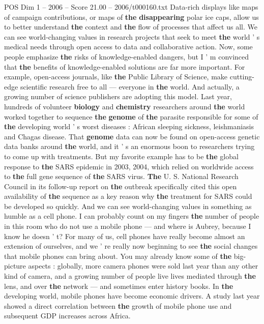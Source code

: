 \begin{textsample}{POS Dim 1 – 2006 – Score 21.00 – 2006/t000160.txt}
Data-rich displays like maps of campaign contributions, or maps of \textbf{the} \textbf{disappearing} polar ice caps, allow us to better understand \textbf{the} context and \textbf{the} flow of processes that affect us all.
We can see world-changing values in research projects that seek to meet \textbf{the} world ' s medical needs through open access to data and collaborative action.
Now, some people emphasize \textbf{the} risks of knowledge-enabled dangers, but I ' m convinced that \textbf{the} benefits of knowledge-enabled solutions are far more important.
For example, open-access journals, like \textbf{the} Public Library of Science, make cutting-edge scientific research free to all — everyone in \textbf{the} world.
And actually, a growing number of science publishers are adopting this model.
Last year, hundreds of volunteer \textbf{biology} and \textbf{chemistry} researchers around \textbf{the} world worked together to sequence \textbf{the} \textbf{genome} of \textbf{the} parasite responsible for some of \textbf{the} developing world ' s worst diseases : African sleeping sickness, leishmaniasis and Chagas disease.
That \textbf{genome} data can now be found on open-access genetic data banks around \textbf{the} world, and it ' s an enormous boon to researchers trying to come up with treatments.
But my favorite example has to be \textbf{the} global response to \textbf{the} SARS epidemic in 2003, 2004, which relied on worldwide access to \textbf{the} full gene sequence of \textbf{the} SARS virus. \textbf{The} U.
S.
National Research Council in its follow-up report on \textbf{the} outbreak specifically cited this open availability of \textbf{the} sequence as a key reason why \textbf{the} treatment for SARS could be developed so quickly.
And we can see world-changing values in something as humble as a cell phone.
I can probably count on my fingers \textbf{the} number of people in this room who do not use a mobile phone — and where is Aubrey, because I know he doesn ' t?
For many of us, cell phones have really become almost an extension of ourselves, and we ' re really now beginning to see \textbf{the} social changes that mobile phones can bring about.
You may already know some of \textbf{the} big-picture aspects : globally, more camera phones were sold last year than any other kind of camera, and a growing number of people live lives mediated through \textbf{the} lens, and over \textbf{the} network — and sometimes enter history books.
In \textbf{the} developing world, mobile phones have become economic drivers.
A study last year showed a direct correlation between \textbf{the} growth of mobile phone use and subsequent GDP increases across Africa.

\end{textsample}
